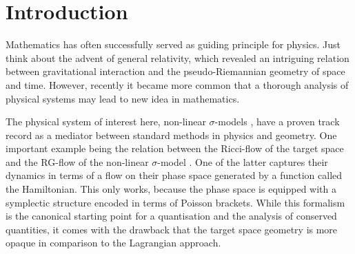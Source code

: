 \documentclass[11pt,a4paper]{article}
\numberwithin{equation}{section}
\begin{document}
\vspace*{-0.5cm}

\renewcommand*{\thefootnote}{\arabic{footnote}}
\setcounter{footnote}{0}

\tableofcontents




\section{Introduction} 
Mathematics has often successfully served as guiding principle for physics. Just think about the advent of general relativity, which revealed an intriguing relation between gravitational interaction and the pseudo-Riemannian geometry of space and time. However, recently it became more common that a thorough analysis of physical systems may lead to new idea in mathematics. 

The physical system of interest here, non-linear $\sigma$-models \cite{GellMann:1960np}, have a proven track record as a mediator between standard methods in physics and geometry. One important example being the relation between the Ricci-flow of the target space and the RG-flow of the non-linear $\sigma$-model \cite{Friedan:1980jf}. One of the latter captures their dynamics in terms of a flow on their phase space generated by a function called the Hamiltonian. This only works, because the phase space is equipped with a symplectic structure encoded in terms of Poisson brackets. While this formalism is the canonical starting point for a quantisation and the analysis of conserved quantities, it comes with the drawback that the target space geometry is more opaque in comparison to the Lagrangian approach.
\end{document}
